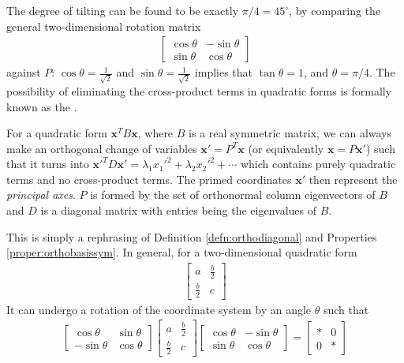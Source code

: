 The degree of tilting can be found to be exactly $\pi/4 = 45^{\circ}$, by comparing the general two-dimensional rotation matrix
\begin{align*}
\begin{bmatrix}
\cos \theta & -\sin \theta \\
\sin \theta & \cos \theta
\end{bmatrix}
\end{align*}
against $P$: $\cos \theta = \frac{1}{\sqrt{2}}$ and $\sin \theta = \frac{1}{\sqrt{2}}$ implies that $\tan \theta = 1$, and $\theta = \pi/4$. The possibility of eliminating the cross-product terms in quadratic forms is formally known as the .

\begin{thm}
For a quadratic form $\textbf{x}^TB\textbf{x}$, where $B$ is a real symmetric matrix, we can always make an orthogonal change of variables $\textbf{x}' = P^T\textbf{x}$ (or equivalently $\textbf{x} = P\textbf{x}'$) such that it turns into $\textbf{x}'^TD\textbf{x}' = \lambda_1 x_1'^2 + \lambda_2 x_2'^2 + \cdots$ which contains purely quadratic terms and no cross-product terms. The primed coordinates $\textbf{x}'$ then represent the \textit{principal axes}. $P$ is formed by the set of orthonormal column eigenvectors of $B$ and $D$ is a diagonal matrix with entries being the eigenvalues of $B$.
\end{thm}
This is simply a rephrasing of Definition \ref{defn:orthodiagonal} and Properties \ref{proper:orthobasissym}. In general, for a two-dimensional quadratic form
\begin{align*}
\begin{bmatrix}
a & \frac{b}{2} \\
\frac{b}{2} & c
\end{bmatrix}
\end{align*}
It can undergo a rotation of the coordinate system by an angle $\theta$ such that
\begin{align*}
\begin{bmatrix}
\cos \theta & \sin \theta \\
-\sin \theta & \cos \theta
\end{bmatrix}
\begin{bmatrix}
a & \frac{b}{2} \\
\frac{b}{2} & c
\end{bmatrix}
\begin{bmatrix}
\cos \theta & -\sin \theta \\
\sin \theta & \cos \theta
\end{bmatrix}
=
\begin{bmatrix}
* & 0\\
0 & *
\end{bmatrix}
\end{align*}
